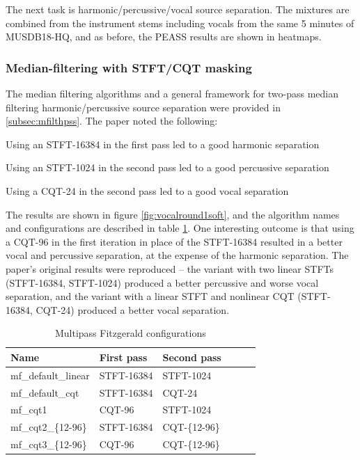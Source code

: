 \documentclass[letter,12pt]{article}
\newenvironment{tight_enumerate}{
\begin{enumerate}
  \setlength{\itemsep}{0pt}
  \setlength{\parskip}{0pt}
}{\end{enumerate}}
\begin{document}
The next task is harmonic/percussive/vocal source separation. The mixtures are combined from the instrument stems including vocals from the same 5 minutes of MUSDB18-HQ, and as before, the PEASS results are shown in heatmaps.

\subsubsection{Median-filtering with STFT/CQT masking}
\label{subsec:mfvocalsep}

The median filtering algorithms and a general framework for two-pass median filtering harmonic/percussive source separation were provided in \ref{subsec:mfilthpss}. The paper \cite{fitzgerald2} noted the following:
\begin{tight_enumerate}
	\item
		Using an STFT-16384 in the first pass led to a good harmonic separation
	\item
		Using an STFT-1024 in the second pass led to a good percussive separation
	\item
		Using a CQT-24 in the second pass led to a good vocal separation
\end{tight_enumerate}

The results are shown in figure \ref{fig:vocalround1soft}, and the algorithm names and configurations are described in table \ref{table:round3softvocal}. One interesting outcome is that using a CQT-96 in the first iteration in place of the STFT-16384 resulted in a better vocal and percussive separation, at the expense of the harmonic separation. The paper's original results were reproduced -- the variant with two linear STFTs (STFT-16384, STFT-1024) produced a better percussive and worse vocal separation, and the variant with a linear STFT and nonlinear CQT (STFT-16384, CQT-24) produced a better vocal separation.

\begin{table}[ht]
	\centering
\begin{tabular}{ |l|l|l|c|c|c| }
	 \hline
	  Name & First pass & Second pass  \\
	 \hline
	 \hline
	 mf\_default\_linear & STFT-16384 & STFT-1024 \\
	 \hline
	 mf\_default\_cqt & STFT-16384 & CQT-24 \\
	 \hline
	 mf\_cqt1 & CQT-96 & STFT-1024 \\
	 \hline
	 mf\_cqt2\_\{12-96\} & STFT-16384 & CQT-\{12-96\} \\
	 \hline
	 mf\_cqt3\_\{12-96\} & CQT-96 & CQT-\{12-96\} \\
	 \hline
\end{tabular}
	\caption{Multipass Fitzgerald configurations}
	\label{table:round3softvocal}
\end{table}
\end{document}
